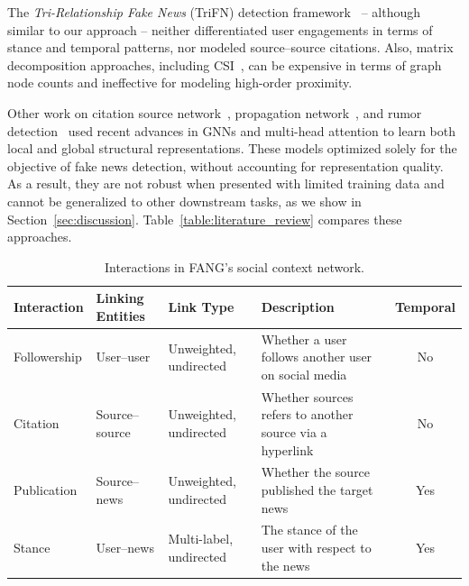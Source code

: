\documentclass[sigconf]{acmart}
\theoremstyle{definition}
\theoremstyle{hypothesis}
\begin{document}
The \emph{Tri-Relationship Fake News} (TriFN) detection framework~\cite{shu2019beyond} -- although similar to our approach -- neither differentiated user engagements in terms of stance and temporal patterns, nor modeled source--source citations. Also, matrix decomposition approaches, including CSI~\cite{ruchansky2017csi}, can be expensive in terms of graph node counts and ineffective for modeling high-order proximity. 

Other work on citation source network~\cite{kulkarni2018multi}, propagation network~\cite{monti2019fake}, and rumor detection~\cite{yuan2019jointly,ming2019multiple} used recent advances in GNNs and multi-head attention to learn both local and global structural representations. 
These models optimized solely for the objective of fake news detection, without accounting for representation quality.
As a result, they are not robust 
when presented with limited training data and cannot be generalized to other downstream tasks, as we show in Section~\ref{sec:discussion}.
Table~\ref{table:literature_review} compares these approaches.

\begin{table}[tbh]
  \centering
  \small
  \caption{Interactions in FANG's social context network.}
  \begin{tabular}{llllc}
  \toprule
    \bf Interaction & \bf Linking Entities & \bf Link Type & \bf Description & \bf Temporal \\ 
    \midrule
    Followership & User--user & Unweighted, undirected & Whether a user follows another user on social media & No \\
    Citation & Source--source & Unweighted, undirected & Whether sources refers to another source via a hyperlink & No \\
    Publication & Source--news & Unweighted, undirected & Whether the source published the target news & Yes \\
    Stance & User--news & Multi-label, undirected & The stance of the user with respect to the news & Yes \\ 
    \bottomrule
  \end{tabular}
  \label{table:social_interactions}
\end{table}
\end{document}
